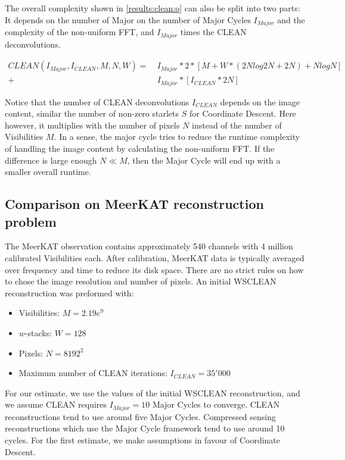 The overall complexity shown in \eqref{results:clean:o} can also be split into two parts: It depends on the number of Major on the number of Major Cycles $I_{Major}$ and the complexity of the non-uniform FFT, and $I_{Major}$ times the CLEAN deconvolutions. 

\begin{equation}\label{results:clean:o}
\begin{aligned}
 CLEAN(I_{Major}, I_{CLEAN}, M, N,  W) =\: &I_{Major} * 2 * [M + W*(2N log 2N + 2N) + N log N]\\
+ &I_{Major} * [I_{CLEAN}*2N]
\end{aligned}
\end{equation}

Notice that the number of CLEAN deconvolutions $I_{CLEAN}$ depends on the image content, similar the number of non-zero starlets $S$ for Coordinate Descent. Here however, it multiplies with the number of pixels $N$ instead of the number of Visibilities $M$. In a sense, the major cycle tries to reduce the runtime complexity of handling the image content by calculating the non-uniform FFT. If the difference is large enough $N \ll M$, then the Major Cycle will end up with a smaller overall runtime.


\subsection{Comparison on MeerKAT reconstruction problem}
The MeerKAT observation contains approximately 540 channels with 4 million calibrated Visibilities each. After calibration, MeerKAT data is typically averaged over frequency and time to reduce its disk space. There are no strict rules on how to chose the image resolution and number of pixels. An initial WSCLEAN reconstruction was preformed with:
\begin{itemize}
	\item Visibilities: $M=2.19e^9$
	\item $w$-stacks: $W = 128$
	\item Pixels: $N = 8192^2$
	\item Maximum number of CLEAN iterations: $I_{CLEAN} = 35'000$
\end{itemize}

For our estimate, we use the values of the initial WSCLEAN reconstruction, and we assume CLEAN requires $I_{Major}=10$ Major Cycles to converge. CLEAN reconstructions tend to use around five Major Cycles. Compressed sensing reconstructions which use the Major Cycle framework tend to use around 10 cycles. For the first estimate, we make assumptions in favour of Coordinate Descent.

